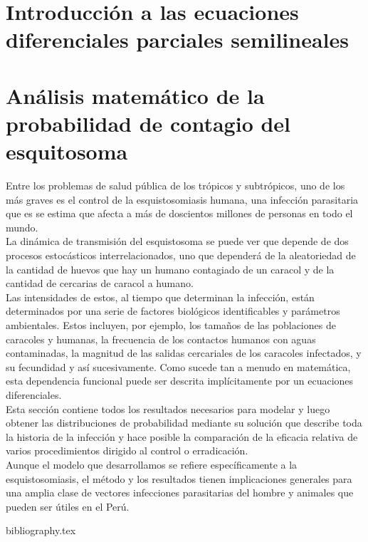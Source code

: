 \documentclass[a4paper,11pt]{book}
\begin{document}
\chapter{Introducción a las ecuaciones diferenciales parciales semilineales}

    
    
    
    

\chapter{Análisis matemático de la probabilidad de contagio del esquitosoma}
Entre los problemas de salud pública de los trópicos y subtrópicos, uno de los más graves es el control de la esquistosomiasis humana, una infección parasitaria que es
se estima que afecta a más de doscientos millones de personas en todo el
mundo.\\
La dinámica de transmisión del esquistosoma se puede ver que depende de dos procesos estocásticos interrelacionados, uno que dependerá de la aleatoriedad de la cantidad de huevos que hay un humano contagiado de un caracol y de la cantidad de cercarias de caracol a humano.\\
Las intensidades de estos, al tiempo que determinan la infección, están determinados por una serie de factores biológicos identificables y parámetros ambientales. Estos incluyen, por ejemplo, los tamaños de las poblaciones de caracoles y humanas, la frecuencia de los contactos humanos con aguas contaminadas, la magnitud de las salidas cercariales de los caracoles infectados, y su fecundidad y así sucesivamente. Como sucede tan a menudo en matemática, esta dependencia funcional puede ser descrita implícitamente por un ecuaciones diferenciales.\\
Esta sección contiene todos los resultados necesarios para modelar y luego obtener las distribuciones de probabilidad mediante su solución que describe toda la historia de la infección y hace posible la comparación de la eficacia relativa de varios procedimientos dirigido al control o erradicación.\\
Aunque el modelo que desarrollamos se refiere específicamente a la esquistosomiasis, el método y los resultados tienen implicaciones generales para una amplia clase de vectores infecciones parasitarias del hombre y animales que pueden ser útiles en el Perú.\\
    
    
    
    

\backmatter

{bibliography.tex}
\end{document}
